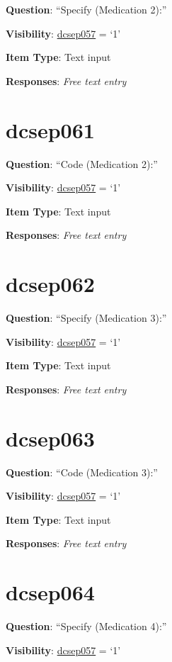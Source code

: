 \documentclass[]{book}
\begin{document}
\textbf{Question}: ``Specify (Medication 2):''

\textbf{Visibility}: \protect\hyperlink{dcsep057}{dcsep057} = `1'

\textbf{Item Type}: Text input

\textbf{Responses}: \emph{Free text entry}

\hypertarget{dcsep061}{%
\section{dcsep061}\label{dcsep061}}

\textbf{Question}: ``Code (Medication 2):''

\textbf{Visibility}: \protect\hyperlink{dcsep057}{dcsep057} = `1'

\textbf{Item Type}: Text input

\textbf{Responses}: \emph{Free text entry}

\hypertarget{dcsep062}{%
\section{dcsep062}\label{dcsep062}}

\textbf{Question}: ``Specify (Medication 3):''

\textbf{Visibility}: \protect\hyperlink{dcsep057}{dcsep057} = `1'

\textbf{Item Type}: Text input

\textbf{Responses}: \emph{Free text entry}

\hypertarget{dcsep063}{%
\section{dcsep063}\label{dcsep063}}

\textbf{Question}: ``Code (Medication 3):''

\textbf{Visibility}: \protect\hyperlink{dcsep057}{dcsep057} = `1'

\textbf{Item Type}: Text input

\textbf{Responses}: \emph{Free text entry}

\hypertarget{dcsep064}{%
\section{dcsep064}\label{dcsep064}}

\textbf{Question}: ``Specify (Medication 4):''

\textbf{Visibility}: \protect\hyperlink{dcsep057}{dcsep057} = `1'
\end{document}
